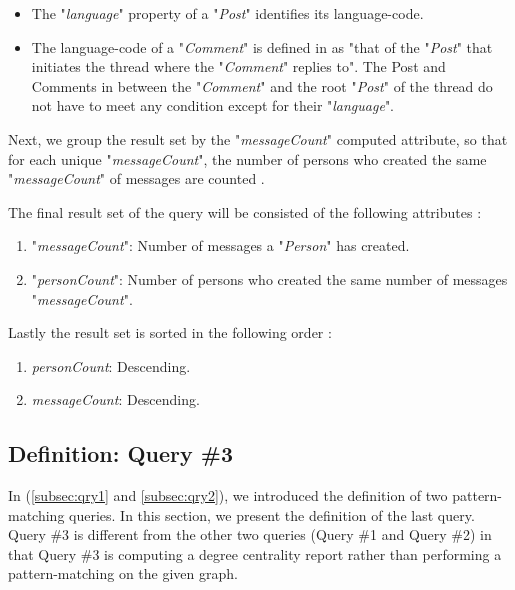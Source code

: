 {\begin{itemize}
    \begin{itemize}
    
    \item The "\textit{language}" property of a "\textit{Post}" identifies its language-code. 
    \item The language-code of a "\textit{Comment}" is defined in \cite{prat2017ldbc} as "that of the "\textit{Post}" that initiates the thread where the "\textit{Comment}" replies to". The Post and Comments in between the "\textit{Comment}" and the root "\textit{Post}" of the thread do not have to meet any condition except for their "\textit{language}".
    
    \end{itemize}
    
\end{itemize}

Next, we group the result set by the "\textit{messageCount}" computed attribute, so that for each unique "\textit{messageCount}", the number of persons who created the same "\textit{messageCount}" of messages are counted \cite{prat2017ldbc}.

The final result set of the query will be consisted of the following attributes \cite{prat2017ldbc}:

\begin{enumerate}
\item "\textit{messageCount}": Number of messages a "\textit{Person}" has created.
\item "\textit{personCount}": Number of persons who created the same number of messages "\textit{messageCount}".

\end{enumerate}

Lastly the result set is sorted in the following order \cite{prat2017ldbc}:

\begin{enumerate}

\item \textit{personCount}: Descending.
\item \textit{messageCount}: Descending.

\end{enumerate}

\subsection{Definition: Query \#3}
\label{subsec:qry3}

In (\ref{subsec:qry1} and \ref{subsec:qry2}), we introduced the definition of two pattern-matching queries. In this section, we present the definition of the last query. Query \#3 is different from the other two queries (Query \#1 and Query \#2) in that Query \#3 is computing a degree centrality report rather than performing a pattern-matching on the given graph. 

}
